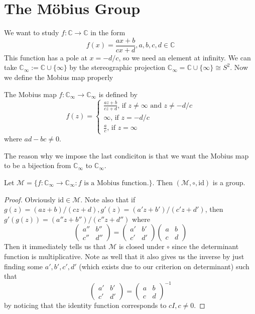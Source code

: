 \section{The M\"obius Group}
We want to study $f:\mathbb C\to\mathbb C$ in the form 
$$f(x)=\frac{ax+b}{cx+d},a,b,c,d\in\mathbb C$$
This function has a pole at $x=-d/c$, so we need an element at infinity.
We can take $\mathbb C_\infty:=\mathbb C\cup\{\infty\}$ by the stereographic projection $\mathbb C_{\infty}=\mathbb C\cup\{\infty\}\cong S^2$.
Now we define the Mobius map properly
\begin{definition}
    The Mobius map $f:\mathbb C_\infty\to\mathbb C_\infty$ is defined by
    $$
    f(z)=
    \begin{cases}
        \frac{az+b}{cz+d}\text{, if $z\neq\infty$ and $z\neq -d/c$}\\
        \infty\text{, if $z=-d/c$}\\
        \frac{a}{c}\text{, if $z=\infty$}
    \end{cases}
    $$
    where $ad-bc\neq 0$.
\end{definition}
The reason why we impose the last condiciton is that we want the Mobius map to be a bijection from $\mathbb C_\infty$ to $\mathbb C_\infty$.
\begin{proposition}
    Let $\mathcal M=\{f:\mathbb C_\infty\to\mathbb C_\infty:f\text{ is a Mobius function.}\}$.
    Then $(\mathcal M,\circ,\mathrm{id})$ is a group.
\end{proposition}
\begin{proof}
    Obviously $\mathrm{id}\in\mathcal M$.
    Note also that if $g(z)=(az+b)/(cz+d), g'(z)=(a'z+b')/(c'z+d')$, then $g'(g(z))=(a''z+b'')/(c''z+d'')$ where
    $$
    \begin{pmatrix}
        a''&b''\\
        c''&d''
    \end{pmatrix}
    =
    \begin{pmatrix}
        a'&b'\\
        c'&d'
    \end{pmatrix}
    \begin{pmatrix}
        a&b\\
        c&d
    \end{pmatrix}
    $$
    Then it immediately tells us that $\mathcal M$ is closed under $\circ$ since the determinant function is multiplicative.
    Note as well that it also gives us the inverse by just finding some $a',b',c',d'$ (which exists due to our criterion on determinant) such that
    $$
    \begin{pmatrix}
        a'&b'\\
        c'&d'
    \end{pmatrix}
    =
    \begin{pmatrix}
        a&b\\
        c&d
    \end{pmatrix}^{-1}
    $$
    by noticing that the identity function corresponds to $cI,c\neq 0$.
\end{proof}
